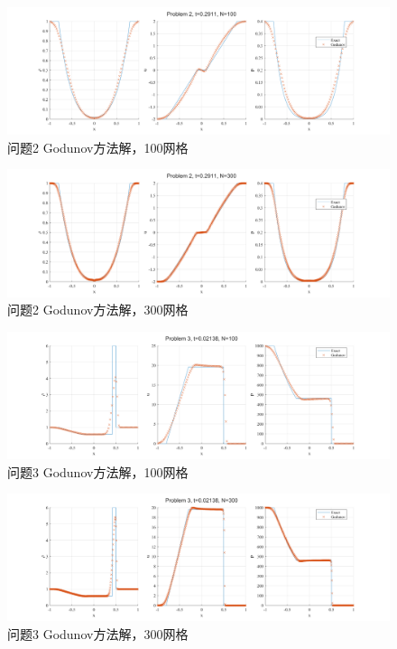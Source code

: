 \documentclass[UTF8,zihao=5]{ctexart} %
\begin{document}
\begin{figure}[H]
    \centering
    \includegraphics[width=18cm]{p2_gn_N100.png}  %
    \caption{问题2 Godunov方法解，100网格}
    \label{fig:2c}
\end{figure}

\begin{figure}[H]
    \centering
    \includegraphics[width=18cm]{p2_gn_N300.png}  %
    \caption{问题2 Godunov方法解，300网格}
    \label{fig:2c}
\end{figure}

\begin{figure}[H]
    \centering
    \includegraphics[width=18cm]{p3_gn_N100.png}  %
    \caption{问题3 Godunov方法解，100网格}
    \label{fig:3c}
\end{figure}

\begin{figure}[H]
    \centering
    \includegraphics[width=18cm]{p3_gn_N300.png}  %
    \caption{问题3 Godunov方法解，300网格}
    \label{fig:3c}
\end{figure}
\end{document}
